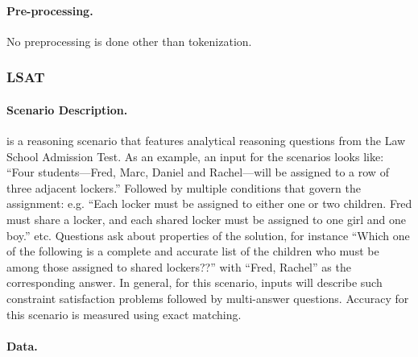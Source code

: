 \paragraph{Pre-processing.} No preprocessing is done other than tokenization.


\subsubsection{LSAT}

\paragraph{Scenario Description.}
\lsat is a reasoning scenario that features analytical reasoning questions from the Law School Admission Test. As an example, an input for the scenarios looks like: ``Four students—Fred, Marc, Daniel and Rachel—will be assigned to a row of three adjacent lockers.'' Followed by multiple conditions that govern the assignment: e.g. ``Each locker must be assigned to either one or two children. Fred must share a locker, and each shared locker must be assigned to one girl and one boy.'' etc. Questions ask about properties of the solution, for instance ``Which one of the following is a complete and accurate list of the children who must be among those assigned to shared lockers??'' with ``Fred, Rachel'' as the corresponding answer. In general, for this scenario, inputs will describe such constraint satisfaction problems followed by multi-answer questions. Accuracy for this scenario is measured using exact matching.

\paragraph{Data.}

